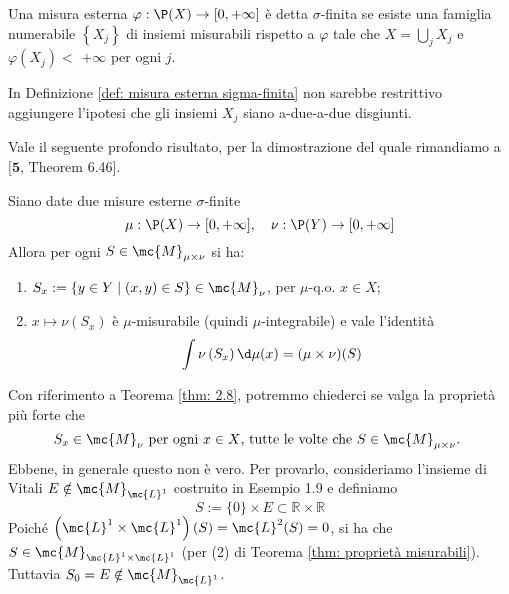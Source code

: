 
\begin{boxdef}\label{def: misura esterna sigma-finita}
    Una misura esterna $\varphi: \P(X) \rightarrow[0,+\infty]$ è detta $\sigma$-finita se esiste una famiglia numerabile $\left\{X_{j}\right\}$ di insiemi misurabili rispetto a $\varphi$ tale che $X=\bigcup_{j} X_{j}$ e $\varphi\left(X_{j}\right)<$ $+\infty$ per ogni $j$.
\end{boxdef}

\begin{oss}
    In Definizione \ref{def: misura esterna sigma-finita} non sarebbe restrittivo aggiungere l'ipotesi che gli insiemi $X_{j}$ siano a-due-a-due disgiunti.
\end{oss}
Vale il seguente profondo risultato, per la dimostrazione del quale rimandiamo a $[\mathbf{5}$, Theorem 6.46].

\begin{shadedTheorem}[Lemmone]\label{thm: 2.8}
    Siano date due misure esterne $\sigma$-finite
    \[\mu: \P(X) \rightarrow[0,+\infty], \quad \nu: \P(Y) \rightarrow[0,+\infty]\]
    Allora per ogni $S \in \mc{M}_{\mu \times \nu}$ si ha:
    \begin{enumerate}
    \item $S_{x}:=\{y \in Y \mid(x, y) \in S\} \in \mc{M}_{\nu}$, per $\mu$-q.o. $x \in X$;
    \item $x \mapsto \nu\left(S_{x}\right)$ è $\mu$-misurabile (quindi $\mu$-integrabile) e vale l'identità
    \[\int \nu\left(S_{x}\right) \d \mu(x)=(\mu \times \nu)(S)\]
    \end{enumerate}
\end{shadedTheorem}


\begin{oss}
    Con riferimento a Teorema \ref{thm: 2.8}, potremmo chiederci se valga la proprietà più forte che
    \[S_{x} \in \mc{M}_{\nu} \text { per ogni } x \in X \text {, tutte le volte che } S \in \mc{M}_{\mu \times \nu} \text {. }\]
    Ebbene, in generale questo non è vero. Per provarlo, consideriamo l'insieme di Vitali $E \notin \mc{M}_{\mc{L}^{1}}$ costruito in Esempio 1.9 e definiamo
    \[S:=\{0\} \times E \subset \mathbb{R} \times \mathbb{R}\]
    Poiché $\left(\mc{L}^{1} \times \mc{L}^{1}\right)(S)=\mc{L}^{2}(S)=0$, si ha che $S \in \mc{M}_{\mc{L}^{1} \times \mc{L}^{1}}$ (per (2) di Teorema \ref{thm: proprietà misurabili}). Tuttavia $S_{0}=E \notin \mc{M}_{\mc{L}^{1}}$.
\end{oss}

